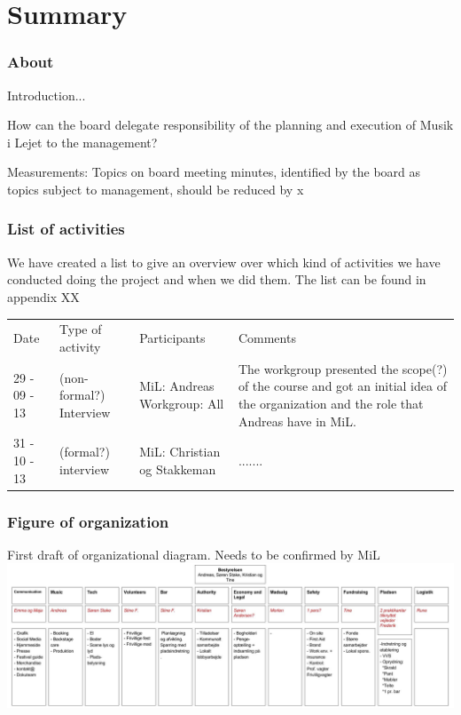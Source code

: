 \part{Summary}

\section{About}
Introduction... 

How can the board delegate responsibility of the planning and execution of Musik i Lejet to the management? 

Measurements:
Topics on board meeting minutes, identified by the board as topics subject to management, should be reduced by x%


\section{List of activities}
We have created a list to give an overview over which kind of activities we have conducted doing the project and when we did them. The list can be found in appendix XX
\begin{center}
\begin{table}
    \begin{tabular}{|p{3cm}|p{3cm}|p{3cm}|p{6cm}|}
    \hline
    Date & Type of activity & Participants & Comments \\
    29 - 09 - 13 & (non-formal?) Interview & MiL: Andreas Workgroup: All & The workgroup presented the scope(?) of the course and got an initial idea of the organization and the role that Andreas have in MiL.  \\
    31 - 10 - 13 & (formal?) interview  & MiL: Christian og Stakkeman &  .......  \\
    \end{tabular}
\end{table}
\end{center}
\section{Figure of organization}
First draft of organizational diagram. Needs to be confirmed by MiL
\includegraphics[scale=0.3, angle=90]{Pictures/MIL_Organisational_chart-Ledelsen.jpg}
